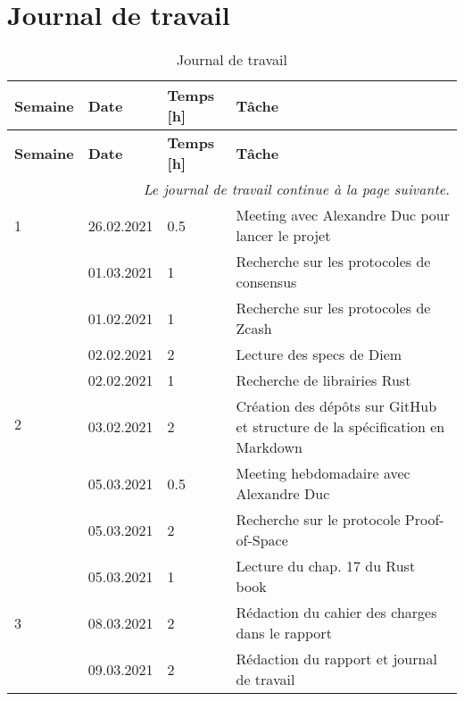 \chapter{Journal de travail}

\bgroup
\def\arraystretch{1.5}
\begin{longtable}[c]{l l l p{8.2cm}}
    \caption{Journal de travail}\\

    \hline
    \textbf{Semaine} & \textbf{Date} & \textbf{Temps [h]} & \textbf{Tâche}\\
    \hline
    \hline
    \endfirsthead
    
    \hline
    \textbf{Semaine} & \textbf{Date} & \textbf{Temps [h]} & \textbf{Tâche}\\
    \hline
    \hline
    \endhead
    
    \multicolumn{4}{r}{\small \it Le journal de travail continue à la page suivante.} \\
    \normalsize
    \endfoot
    
    \hline
    \endlastfoot
	
	1
	& 26.02.2021
	& 0.5
	& Meeting avec Alexandre Duc pour lancer le projet \\
	
	\hline
	
	\multirow{8}{*}{2}
	& 01.03.2021
	& 1
	& Recherche sur les protocoles de consensus \\
	
	& 01.02.2021
	& 1
	& Recherche sur les protocoles de Zcash \\
	
	& 02.02.2021
	& 2
	& Lecture des specs de Diem \\
	
	& 02.02.2021
	& 1
	& Recherche de librairies Rust \\
	
	& 03.02.2021
	& 2
	& Création des dépôts sur GitHub et structure de la spécification en Markdown \\
	
	& 05.03.2021
	& 0.5
	& Meeting hebdomadaire avec Alexandre Duc \\
	
	& 05.03.2021
	& 2
	& Recherche sur le protocole Proof-of-Space \\
	
	& 05.03.2021
	& 1
	& Lecture du chap. 17 du Rust book \\
	
	\hline
	
	\multirow{1}{*}{3}
	& 08.03.2021
	& 2
	& Rédaction du cahier des charges dans le rapport \\
	
	& 09.03.2021
	& 2
	& Rédaction du rapport et journal de travail \\
	
\end{longtable}
\egroup